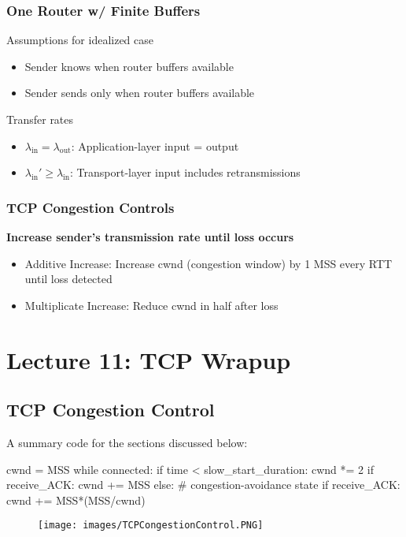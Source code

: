 \documentclass[a4paper]{article}
\begin{document}
\subsubsection{One Router w/ Finite Buffers}
Assumptions for idealized case
\begin{itemize}
    \item Sender knows when router buffers available
    \item Sender sends only when router buffers available
\end{itemize}
Transfer rates
\begin{itemize}
    \item $\lambda_{\text{in}} = \lambda_{\text{out}}$: Application-layer input = output
    \item $\lambda_{\text{in}}' \geq \lambda_{\text{in}}$: Transport-layer input includes retransmissions
\end{itemize}

\subsubsection{TCP Congestion Controls}
\noindent\textbf{Increase sender's transmission rate until loss occurs}
\begin{itemize}
    \item Additive Increase: Increase cwnd (congestion window) by 1 MSS every RTT until loss detected
    \item Multiplicate Increase: Reduce cwnd in half after loss
\end{itemize}

\newpage
\section{Lecture 11: TCP Wrapup}
\subsection{TCP Congestion Control}
A summary code for the sections discussed below:
\begin{python}
    cwnd = MSS
    while connected:
    if time < slow_start_duration:
        cwnd *= 2
        if receive_ACK: 
        cwnd += MSS
    else: # congestion-avoidance state
        if receive_ACK:
        cwnd += MSS*(MSS/cwnd)
\end{python}
\begin{figure}[H]
    \centering
    \texttt{[image: images/TCPCongestionControl.PNG]}
\end{figure}
\end{document}
